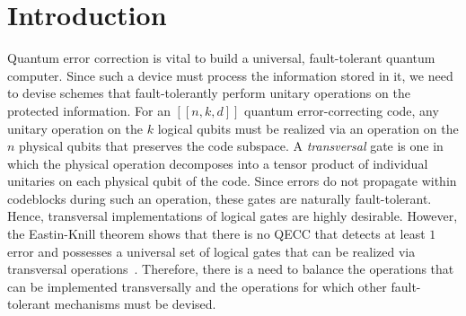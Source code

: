 \documentclass[twoside,romanappendices]{IEEEtran}
\newcommand{\red}[1]{{\color{red}#1}}
\newcommand{\llbr}{[\![}
\newcommand{\rrbr}{]\!]}
\begin{document}
\section{Introduction}
\label{sec:intro}


Quantum error correction is vital to build a universal, fault-tolerant quantum computer.
Since such a device must process the information stored in it, we need to devise schemes that fault-tolerantly perform unitary operations on the protected information.
For an $\llbr n,k,d \rrbr$ quantum error-correcting code, any unitary operation on the $k$ logical qubits must be realized via an operation on the $n$ physical qubits that preserves the code subspace.
A \emph{transversal} gate is one in which the physical operation decomposes into a tensor product of individual unitaries on each physical qubit of the code.
Since errors do not propagate within codeblocks during such an operation, these gates are naturally fault-tolerant. 
Hence, transversal implementations of logical gates are highly desirable.
However, the Eastin-Knill theorem shows that there is no QECC that detects at least $1$ error and possesses a universal set of logical gates that can be realized via transversal operations~\cite{Eastin-prl09, Zeng-it07}.
Therefore, there is a need to balance the operations that can be implemented transversally and the operations for which other fault-tolerant mechanisms must be devised.
\end{document}
